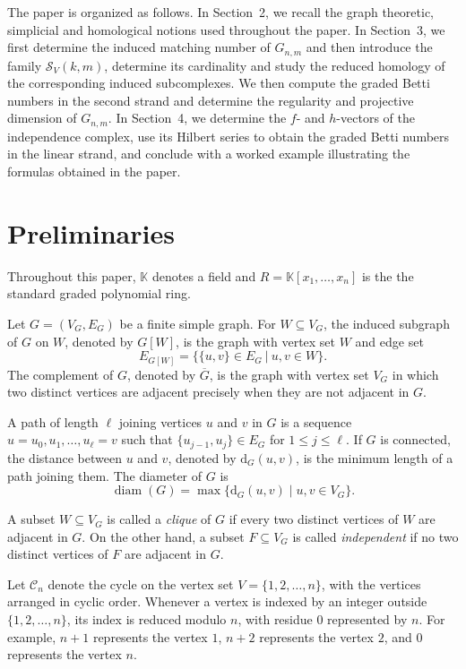 \documentclass[12pt,reqno]{amsart}
\theoremstyle{definition}
\numberwithin{equation}{section}
\def\C{\mathcal{C}}
\def\K{\mathbb{K}}
\begin{document}
The paper is organized as follows. In Section~2, we recall the graph
theoretic, simplicial and homological notions used throughout the
paper. In Section~3, we first determine the induced matching number of
$G_{n,m}$ and then introduce the family $\mathcal{S}_V(k,m)$, determine
its cardinality and study the reduced homology of the corresponding
induced subcomplexes. We then compute the graded Betti
numbers in the second strand and determine the regularity and
projective dimension of $G_{n,m}$. In Section~4, we determine the $f$- and $h$-vectors of the independence
complex, use its Hilbert series to obtain the graded Betti numbers in
the linear strand, and conclude with a worked example illustrating the
formulas obtained in the paper.
\section{Preliminaries}
\noindent
Throughout this paper, $\K$ denotes a field and
$R=\K[x_1,\ldots,x_n]$ is the the standard graded polynomial ring.

Let $G=(V_G,E_G)$ be a finite simple graph. For $W\subseteq V_G$, the
induced subgraph of $G$ on $W$, denoted by $G[W]$, is the graph with vertex
set $W$ and edge set \[ E_{G[W]}=\{\{u,v\}\in E_G~|~u,v\in W\}. \]
The complement of $G$, denoted by $\overline G$, is the graph with vertex
set $V_G$ in which two distinct vertices are adjacent precisely when they
are not adjacent in $G$.

A path of length $\ell$ joining vertices $u$ and $v$ in $G$ is a
sequence \( u=u_0,u_1,\ldots,u_\ell=v \)
such that $\{u_{j-1},u_j\}\in E_G$ for $1\leq j\leq\ell$. If $G$ is
connected, the distance between $u$ and $v$, denoted by
$\mathrm d_G(u,v)$, is the minimum length of a path joining them. The
diameter of $G$ is
\[
\operatorname{diam}(G)
=
\max\{\mathrm d_G(u,v)\mid u,v\in V_G\}.
\] 

A subset $W\subseteq V_G$ is called a \emph{clique} of $G$ if every
two distinct vertices of $W$ are adjacent in $G$. On the other hand, a subset
$F\subseteq V_G$ is called \emph{independent} if no two distinct
vertices of $F$ are adjacent in $G$. 

Let $\C_n$ denote the cycle on the vertex set
$V=\{1,2,\ldots,n\}$, with the vertices arranged in cyclic order.
Whenever a vertex is indexed by an integer outside
$\{1,2,\ldots,n\}$, its index is reduced modulo $n$, with residue $0$
represented by $n$.
For example, $n+1$ represents the vertex $1$, $n+2$ represents the
vertex $2$, and $0$ represents the vertex $n$.
\end{document}
